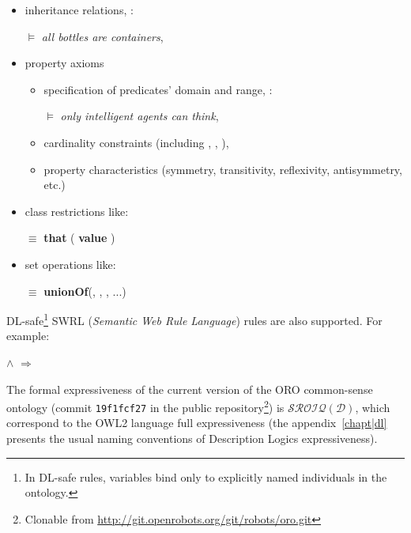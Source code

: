 \begin{itemize}
    \item inheritance relations, \eg: \par
     $\models$ \emph{all bottles are containers},

    \item property axioms
        \begin{itemize}

        \item specification of predicates' domain and range, \eg:\par
         $\models$ \emph{only
        intelligent agents can think},

        \item cardinality constraints (including , 
        , ),

        \item property characteristics (symmetry, transitivity, reflexivity,
        antisymmetry, etc.)

        \end{itemize}

    \item class restrictions like: \par {} $\equiv$
         {\bf that} ( {\bf value}
        )

    \item set operations like: \par {} $\equiv$ {\bf unionOf}(,
        , , ...)
\end{itemize}

DL-safe\footnote{In DL-safe rules, variables bind only to explicitly named
individuals in the ontology.} SWRL ({\em Semantic Web Rule Language}) rules are
also supported. For example: \par
         $\land$
         $\Rightarrow$ 


The formal expressiveness of the current version of the ORO common-sense
ontology (commit {\tt 19f1fcf27} in the public repository\footnote{Clonable
from \url{http://git.openrobots.org/git/robots/oro.git}}) is
$\mathcal{SROIQ(D)}$, which correspond to the OWL2 language full expressiveness (the
appendix~\ref{chapt|dl} presents the usual naming conventions of Description
Logics expressiveness).

